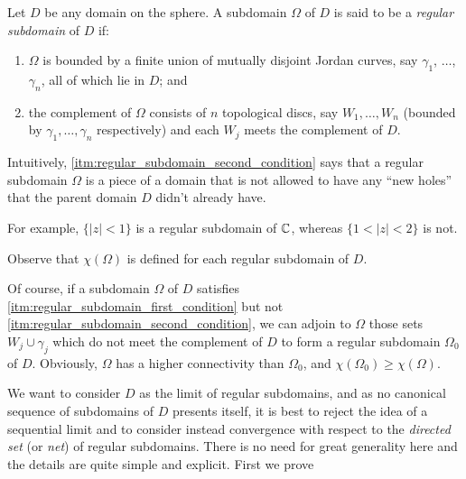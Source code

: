 \begin{definition}
    Let $D$ be any domain on the sphere. A subdomain $\Omega$ of $D$ is said to
    be a \emph{regular subdomain} of $D$ if:
    \begin{enumerate}[label=(\arabic*)]
        \item \label{itm:regular_subdomain_first_condition} $\Omega$ is bounded
        by a finite union of mutually disjoint Jordan curves, say $\gamma_1$,
        $\dots$, $\gamma_n$, all of which lie in $D$; and
        \item \label{itm:regular_subdomain_second_condition} the complement of
        $\Omega$ consists of $n$ topological discs, say $W_1, \dots, W_n$
        (bounded by $\gamma_1, \dots, \gamma_n$ respectively) and each $W_j$
        meets the complement of $D$.
    \end{enumerate}
\end{definition}

Intuitively, \ref{itm:regular_subdomain_second_condition} says that a regular
subdomain $\Omega$ is a piece of a domain that is not allowed to have any
\enquote{new holes} that the parent domain $D$ didn't already have.

\begin{example}
    For example, $\{|z| < 1\}$ is a regular subdomain of $\mathbb{C}$, whereas $\{1 <
    |z| < 2\}$ is not.
\end{example}

Observe that $\chi(\Omega)$ is defined for each regular subdomain of $D$.

Of course, if a subdomain $\Omega$ of $D$ satisfies
\ref{itm:regular_subdomain_first_condition} but not
\ref{itm:regular_subdomain_second_condition}, we can adjoin to $\Omega$ those
sets $W_j \cup \gamma_j$ which do not meet the complement of $D$ to form a
regular subdomain $\Omega_0$ of $D$. Obviously, $\Omega$ has a higher
connectivity than $\Omega_0$, and $\chi(\Omega_0) \geq \chi(\Omega)$.

We want to consider $D$ as the limit of regular subdomains, and as no canonical
sequence of subdomains of $D$ presents itself, it is best to reject the idea of
a sequential limit and to consider instead convergence with respect to the
\emph{directed set} (or \emph{net}) of regular subdomains. There is no need for
great generality here and the details are quite simple and explicit. First we
prove

